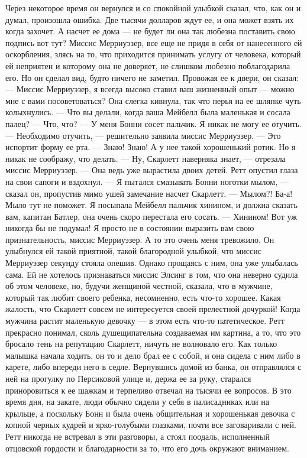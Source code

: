 Через некоторое время он вернулся и со спокойной улыбкой сказал, что, как он и думал, произошла ошибка. Две тысячи долларов ждут ее, и она может взять их когда захочет. А насчет ее дома — не будет ли она так любезна поставить свою подпись вот тут?
Миссис Мерриуэзер, все еще не придя в себя от нанесенного ей оскорбления, злясь на то, что приходится принимать услугу от человека, который ей неприятен и которому она не доверяет, не слишком любезно поблагодарила его.
Но он сделал вид, будто ничего не заметил. Провожая ее к двери, он сказал:
— Миссис Мерриуэзер, я всегда высоко ставил ваш жизненный опыт — можно мне с вами посоветоваться?
Она слегка кивнула, так что перья на ее шляпке чуть колыхнулись.
— Что вы делали, когда ваша Мейбелл была маленькая и сосала палец?
— Что, что?
— У меня Бонни сосет пальчик. Я никак не могу ее отучить.
— Необходимо отучить, — решительно заявила миссис Мерриуэзер. — Это испортит форму ее рта.
— Знаю! Знаю! А у нее такой хорошенький ротик. Но я никак не соображу, что делать.
— Ну, Скарлетт наверняка знает, — отрезала миссис Мерриуэзер. — Она ведь уже вырастила двоих детей.
Ретт опустил глаза на свои сапоги и вздохнул.
— Я пытался смазывать Бонни ноготки мылом, — сказал он, пропустив мимо ушей замечание насчет Скарлетт.
— Мылом?! Ба-а! Мыло тут не поможет. Я посыпала Мейбелл пальчик хинином, и должна сказать вам, капитан Батлер, она очень скоро перестала его сосать.
— Хинином! Вот уж никогда бы не подумал! Я просто не в состоянии выразить вам свою признательность, миссис Мерриуэзер. А то это очень меня тревожило.
Он улыбнулся ей такой приятной, такой благородной улыбкой, что миссис Мерриуэзер секунду стояла опешив. Однако прощаясь с ним, она уже улыбалась сама. Ей не хотелось признаваться миссис Элсинг в том, что она неверно судила об этом человеке, но, будучи женщиной честной, сказала, что в мужчине, который так любит своего ребенка, несомненно, есть что-то хорошее. Какая жалость, что Скарлетт совсем не интересуется своей прелестной дочуркой! Когда мужчина растит маленькую девочку — в этом есть что-то патетическое. Ретт прекрасно понимал, сколь душещипательна создаваемая им картина, а то, что это бросало тень на репутацию Скарлетт, ничуть не волновало его.
Как только малышка начала ходить, он то и дело брал ее с собой, и она сидела с ним либо в карете, либо впереди него в седле. Вернувшись домой из банка, он отправлялся с ней на прогулку по Персиковой улице и, держа ее за руку, старался приноровиться к ее шажкам и терпеливо отвечал на тысячи ее вопросов. В это время дня, на закате, люди обычно сидели у себя в палисадниках или на крыльце, а поскольку Бонн и была очень общительная и хорошенькая девочка с копной черных кудрей и ярко-голубыми глазками, почти все заговаривали с ней. Ретт никогда не встревал в эти разговоры, а стоял поодаль, исполненный отцовской гордости и благодарности за то, что его дочь окружают вниманием.
